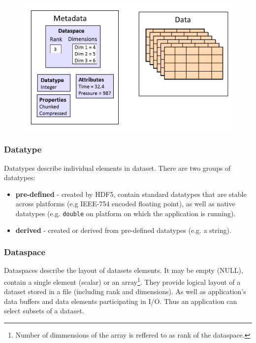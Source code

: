 \documentclass[thesis=M,english]{FITthesis}[2019/12/23]
\begin{document}
\begin{figure}[H]
    \centering
    \includegraphics[scale=0.3]{static/dataset.png}
\end{figure}

\subsubsection{Datatype}

Datatypes describe individual elements in dataset. There are two groups of datatypes:
\begin{itemize}
    \item \textbf{pre-defined} - created by HDF5, contain standard datatypes that are stable across platforms
          (e.g IEEE-754 encoded floating point), as well as native datatypes (e.g. \texttt{double} on platform
          on which the application is running).
    \item \textbf{derived} - created or derived from pre-defined datatypes (e.g. a string).
\end{itemize}

\subsubsection{Dataspace}

Dataspaces describe the layout of datasets elements. It may be empty (NULL), contain a single element (scalar)
or an array\footnote{Number of dimmensions of the array is reffered to as rank of the dataspace.}. They provide
logical layout of a dataset stored in a file (including rank and dimensions). As well as application's data buffers
and data elements participating in I/O. Thus an application can select subsets of a dataset.
\end{document}

